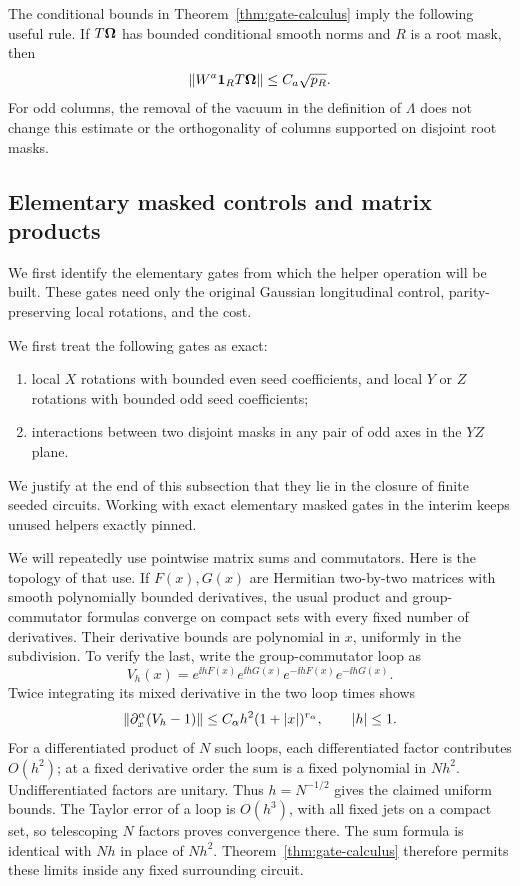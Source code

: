 The conditional bounds in Theorem~\ref{thm:gate-calculus} imply the
following useful rule.  If \(T\boldsymbol\Omega\) has bounded conditional smooth
norms and \(R\) is a root mask, then
\begin{equation}
 \lVert W^a\mathbf 1_R T\boldsymbol\Omega\rVert\le C_a\sqrt{p_R}.
 \label{eq:synthesis-masked-column-bound}
\end{equation}
For odd columns, the removal of the vacuum in the definition of
\(\Lambda\) does not change this estimate or the orthogonality of
columns supported on disjoint root masks.

\subsection{Elementary masked controls and matrix products}
\label{sec:elementary-masked-controls}

We first identify the elementary gates from which the helper
operation will be built.  These gates need only the original Gaussian
longitudinal control, parity-preserving local rotations, and the cost.

We first treat the following gates as exact:
\begin{enumerate}
\item local \(X\) rotations with bounded even seed coefficients,
      and local \(Y\) or \(Z\) rotations with bounded odd seed
      coefficients;
\item interactions between two disjoint masks in any pair of odd axes
      in the \(YZ\) plane.
\end{enumerate}
We justify at the end of this subsection that they lie in the closure
of finite seeded circuits.  Working with exact elementary masked gates
in the interim keeps unused helpers exactly pinned.

We will repeatedly use pointwise matrix sums and commutators.  Here
is the topology of that use.  If \(F(x),G(x)\) are Hermitian
two-by-two matrices with smooth polynomially bounded derivatives,
the usual product and group-commutator formulas converge on compact
sets with every fixed number of derivatives.  Their derivative bounds
are polynomial in \(x\), uniformly in the subdivision.  To verify the
last, write the group-commutator loop as
\[
 V_h(x)=e^{\ii hF(x)}e^{\ii hG(x)}
                e^{-\ii hF(x)}e^{-\ii hG(x)}.
\]
Twice integrating its mixed derivative in the two loop times shows
\[
 \lVert \partial_x^\alpha(V_h-1)\rVert
     \le C_\alpha h^2(1+|x|)^{r_\alpha},\qquad |h|\le1.
\]
For a differentiated product of \(N\) such loops, each differentiated
factor contributes \(O(h^2)\); at a fixed derivative order the sum
is a fixed polynomial in \(Nh^2\).  Undifferentiated factors are
unitary.  Thus \(h=N^{-1/2}\) gives the claimed uniform bounds.
The Taylor error of a loop is \(O(h^3)\), with all fixed jets on a
compact set, so telescoping \(N\) factors proves convergence there.
The sum formula is identical with \(Nh\) in place of \(Nh^2\).
Theorem~\ref{thm:gate-calculus} therefore permits these limits inside
any fixed surrounding circuit.

